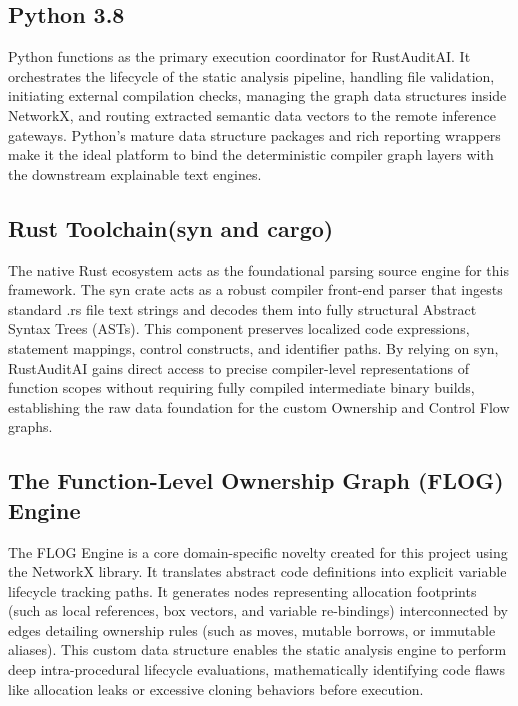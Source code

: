 \subsection{Python 3.8}
\hspace{0.5cm}
Python functions as the primary execution coordinator for RustAuditAI. It orchestrates the lifecycle of the static analysis pipeline, handling file validation, initiating external compilation checks, managing the graph data structures inside NetworkX, and routing extracted semantic data vectors to the remote inference gateways. Python’s mature data structure packages and rich reporting wrappers make it the ideal platform to bind the deterministic compiler graph layers with the downstream explainable text engines.

\subsection{Rust Toolchain(syn and cargo)}
\hspace{0.5cm}
The native Rust ecosystem acts as the foundational parsing source engine for this framework. The syn crate acts as a robust compiler front-end parser that ingests standard .rs file text strings and decodes them into fully structural Abstract Syntax Trees (ASTs). This component preserves localized code expressions, statement mappings, control constructs, and identifier paths. By relying on syn, RustAuditAI gains direct access to precise compiler-level representations of function scopes without requiring fully compiled intermediate binary builds, establishing the raw data foundation for the custom Ownership and Control Flow graphs.

\subsection{The Function-Level Ownership Graph (FLOG) Engine}
\hspace{0.5cm}
The FLOG Engine is a core domain-specific novelty created for this project using the NetworkX library. It translates abstract code definitions into explicit variable lifecycle tracking paths. It generates nodes representing allocation footprints (such as local references, box vectors, and variable re-bindings) interconnected by edges detailing ownership rules (such as moves, mutable borrows, or immutable aliases). This custom data structure enables the static analysis engine to perform deep intra-procedural lifecycle evaluations, mathematically identifying code flaws like allocation leaks or excessive cloning behaviors before execution.


